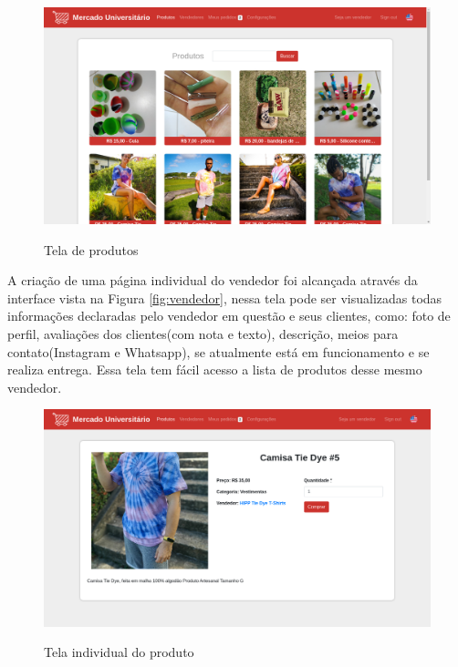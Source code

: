 \begin{figure}[htbp!]
  \centering
  \caption{Tela de produtos}
  \includegraphics[width=1\textwidth]{figs/resultado/produtos.png}
    \label{fig:produtos}
\end{figure}

A criação de uma página individual do vendedor foi alcançada através da interface vista na Figura \ref{fig:vendedor}, nessa tela pode ser visualizadas todas informações declaradas pelo vendedor em questão e seus clientes, como: foto de perfil, avaliações dos clientes(com nota e texto), descrição, meios para contato(Instagram e Whatsapp), se atualmente está em funcionamento e se realiza entrega. Essa tela tem fácil acesso a lista de produtos desse mesmo vendedor.

\begin{figure}[htbp!]
  \centering
  \caption{Tela individual do produto}
  \includegraphics[width=1\textwidth]{figs/resultado/produto.png}
    \label{fig:produto}
\end{figure}

